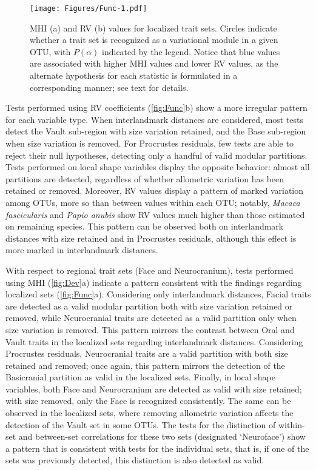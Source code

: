 \documentclass[12pt,]{article}
\begin{document}
\begin{figure}[htbp]
\centering
\texttt{[image: Figures/Func-1.pdf]}
\caption{MHI (a) and RV (b) values for localized trait sets. Circles
indicate whether a trait set is recognized as a variational module in a
given OTU, with $P(\alpha)$ indicated by the legend. Notice that blue
values are associated with higher MHI values and lower RV values, as the
alternate hypothesis for each statistic is formulated in a corresponding
manner; see text for details. \label{fig:Func}}
\end{figure}

Tests performed using RV coefficients (\autoref{fig:Func}b) show a more
irregular pattern for each variable type. When interlandmark distances
are considered, most tests detect the Vault sub-region with size
variation retained, and the Base sub-region when size variation is
removed. For Procrustes residuals, few tests are able to reject their
null hypotheses, detecting only a handful of valid modular partitions.
Tests performed on local shape variables display the opposite behavior:
almost all partitions are detected, regardless of whether allometric
variation has been retained or removed. Moreover, RV values display a
pattern of marked variation among OTUs, more so than between values
within each OTU; notably, \emph{Macaca fascicularis} and \emph{Papio
anubis} show RV values much higher than those estimated on remaining
species. This pattern can be observed both on interlandmark distances
with size retained and in Procrustes residuals, although this effect is
more marked in interlandmark distances.

With respect to regional trait sets (Face and Neurocranium), tests
performed using MHI (\autoref{fig:Dev}a) indicate a pattern consistent
with the findings regarding localized sets (\autoref{fig:Func}a).
Considering only interlandmark distances, Facial traits are detected as
a valid modular partition both with size variation retained or removed,
while Neurocranial traits are detected as a valid partition only when
size variation is removed. This pattern mirrors the contrast between
Oral and Vault traits in the localized sets regarding interlandmark
distances. Considering Procrustes residuals, Neurocranial traits are a
valid partition with both size retained and removed; once again, this
pattern mirrors the detection of the Basicranial partition as valid in
the localized sets. Finally, in local shape variables, both Face and
Neurocranium are detected as valid with size retained; with size
removed, only the Face is recognized consistently. The same can be
observed in the localized sets, where removing allometric variation
affects the detection of the Vault set in some OTUs. The tests for the
distinction of within-set and between-set correlations for these two
sets (designated `Neuroface') show a pattern that is consistent with
tests for the individual sets, that is, if one of the sets was
previously detected, this distinction is also detected as valid.
\end{document}
